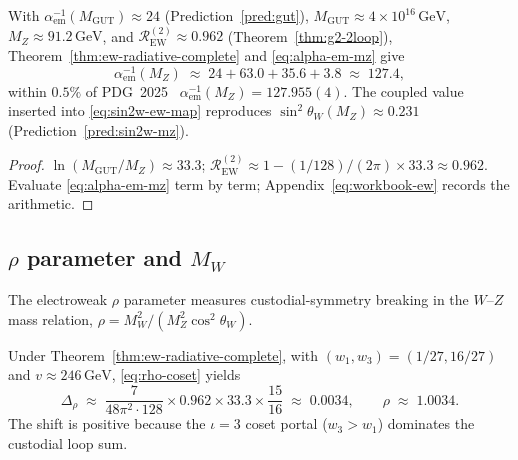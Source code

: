\begin{proposition}
\label{prop:alpha-em-mz}
With $\alpha_{\mathrm{em}}^{-1}(M_{\mathrm{GUT}})\approx24$
(Prediction~\ref{pred:gut}), $M_{\mathrm{GUT}}\approx4\times10^{16}\,\mathrm{GeV}$,
$M_Z\approx91.2\,\mathrm{GeV}$, and $\mathcal{R}_{\mathrm{EW}}^{(2)}\approx0.962$
(Theorem~\ref{thm:g2-2loop}), Theorem~\ref{thm:ew-radiative-complete} and
\eqref{eq:alpha-em-mz} give
\begin{equation}\label{eq:alpha-em-numeric}
  \alpha_{\mathrm{em}}^{-1}(M_Z)
  \;\approx\;
  24 + 63.0 + 35.6 + 3.8
  \;\approx\;
  127.4,
\end{equation}
within $0.5\%$ of PDG~2025~\cite{PDG2025}
$\alpha_{\mathrm{em}}^{-1}(M_Z)=127.955(4)$. The coupled value inserted into
\eqref{eq:sin2w-ew-map} reproduces $\sin^2\theta_W(M_Z)\approx0.231$
(Prediction~\ref{pred:sin2w-mz}).
\end{proposition}

\begin{proof}
$\ln(M_{\mathrm{GUT}}/M_Z)\approx33.3$;
$\mathcal{R}_{\mathrm{EW}}^{(2)}\approx1-(1/128)/(2\pi)\times33.3\approx0.962$.
Evaluate \eqref{eq:alpha-em-mz} term by term; Appendix~\eqref{eq:workbook-ew}
records the arithmetic.
\end{proof}

\subsection{\texorpdfstring{$\rho$}{rho} parameter and \texorpdfstring{$M_W$}{MW}}
\label{sec:ew-precision:rho-mw}

The electroweak $\rho$ parameter measures custodial-symmetry breaking in the
$W$--$Z$ mass relation,
$\rho=M_W^2/(M_Z^2\cos^2\theta_W)$.

\begin{proposition}
\label{prop:rho-parameter}
Under Theorem~\ref{thm:ew-radiative-complete}, with
$(w_1,w_3)=(1/27,16/27)$ and $v\approx246\,\mathrm{GeV}$,
\eqref{eq:rho-coset} yields
\begin{equation}\label{eq:rho-numeric}
  \Delta_\rho
  \;\approx\;
  \frac{7}{48\pi^2\cdot 128}\times 0.962\times 33.3\times\frac{15}{16}
  \;\approx\;
  0.0034,
  \qquad
  \rho \;\approx\; 1.0034.
\end{equation}
The shift is positive because the $\iota=3$ coset portal
($w_3>w_1$) dominates the custodial loop sum.
\end{proposition}

